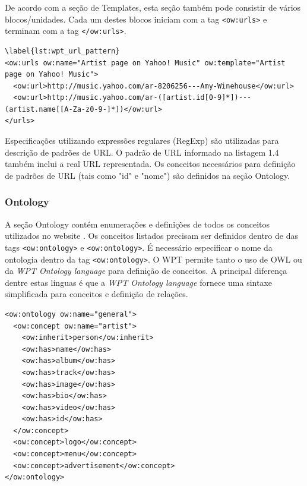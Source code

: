 De acordo com a seção de Templates, esta seção também pode consistir de vários blocos/unidades. Cada um destes blocos iniciam com a tag \texttt{<ow:urls>} e terminam com a tag \texttt{</ow:urls>}.


\begin{lstlisting}
\label{lst:wpt_url_pattern}
<ow:urls ow:name="Artist page on Yahoo! Music" ow:template="Artist page on Yahoo! Music">
  <ow:url>http://music.yahoo.com/ar-8206256---Amy-Winehouse</ow:url>
  <ow:url>http://music.yahoo.com/ar-([artist.id[0-9]*])---(artist.name[[A-Za-z0-9-]*])</ow:url>
</urls>
\end{lstlisting}

Especificações utilizando expressões regulares (RegExp) são utilizadas para descrição de padrões de URL. O padrão de URL informado na listagem 1.4 também inclui a real URL representada. Os conceitos necessários para definição de padrões de URL (tais como "id" e "nome") são definidos na seção Ontology.

\subsubsection{Ontology}

A seção Ontology contém enumerações e definições de todos os conceitos utilizados no website \cite{wpt}. Os conceitos listados precisam ser definidos dentro de das tags \texttt{<ow:ontology>} e \texttt{<ow:ontology>}. É necessário especificar o nome da ontologia dentro da tag \texttt{<ow:ontology>}. O WPT permite tanto o uso de OWL ou da \emph{WPT Ontology language} para definição de conceitos. A principal diferença dentre estas línguas é que a \emph{WPT Ontology language} fornece uma sintaxe simplificada para conceitos e definição de relações.

\begin{lstlisting}
<ow:ontology ow:name="general">
  <ow:concept ow:name="artist">
    <ow:inherit>person</ow:inherit>
    <ow:has>name</ow:has>
    <ow:has>album</ow:has>
    <ow:has>track</ow:has>
    <ow:has>image</ow:has>
    <ow:has>bio</ow:has>
    <ow:has>video</ow:has>
    <ow:has>id</ow:has>
  </ow:concept>
  <ow:concept>logo</ow:concept>
  <ow:concept>menu</ow:concept>
  <ow:concept>advertisement</ow:concept>
</ow:ontology>
\end{lstlisting}

